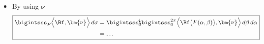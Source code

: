 \documentclass[12pt]{article}
\begin{document}
\begin{enumerate}[(i)]
\begin{itemize}
		      \item  By using $\bm{\nu}$
		            \begin{align}
			            \boxed{
				            \begin{aligned}
					            \bigintsss_F
					            \Big\langle \Bf , \bm{\nu} \Big\rangle \,d\sigma
					             & = \bigintsss_0^1 \!\!\! \bigintsss_0^{2\pi}
					            \Big\langle \Bf\big(F(\alpha,\beta)\big), \bm{\nu} \Big\rangle
					            \,d\beta \, d\alpha                                                                                               \\
					             & = \dots
				            \end{aligned}
			            }
		            \end{align}
	      \end{itemize}
\end{enumerate}

\clearpage
\end{document}
